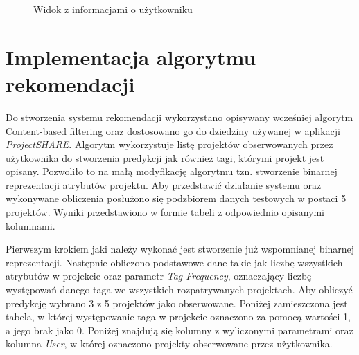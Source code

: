 \begin{figure}[h!]
	\caption{Widok z informacjami o użytkowniku}
	\centering
\end{figure}

\clearpage

\section{Implementacja algorytmu rekomendacji}

Do stworzenia systemu rekomendacji wykorzystano opisywany wcześniej algorytm Content-based filtering oraz dostosowano go do dziedziny używanej w aplikacji  \mbox{\textit{ProjectSHARE}}. Algorytm wykorzystuje listę projektów obserwowanych przez użytkownika do stworzenia predykcji jak również tagi, którymi projekt jest opisany. Pozwoliło to na małą modyfikację algorytmu tzn. stworzenie binarnej reprezentacji atrybutów projektu. Aby przedstawić działanie systemu oraz wykonywane obliczenia posłużono się podzbiorem danych testowych w postaci 5 projektów. Wyniki przedstawiono w formie tabeli z odpowiednio opisanymi kolumnami.

Pierwszym krokiem jaki należy wykonać jest stworzenie już wspomnianej binarnej reprezentacji. Następnie obliczono podstawowe dane takie jak liczbę wszystkich atrybutów w projekcie oraz parametr \textit{Tag Frequency}, oznaczający liczbę występowań danego taga we wszystkich rozpatrywanych projektach. Aby obliczyć predykcję wybrano 3 z 5 projektów jako obserwowane. Poniżej zamieszczona jest tabela, w której występowanie taga w projekcie oznaczono za pomocą wartości 1, a jego brak jako 0. Poniżej znajdują się kolumny z wyliczonymi parametrami oraz kolumna \textit{User}, w której oznaczono projekty obserwowane przez użytkownika.   

